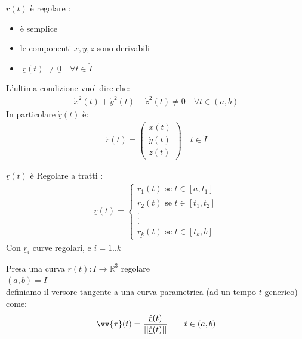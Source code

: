 \documentclass[a4paper, oneside]{article}
\begin{document}
\begin{definition}
    $\underbar{r}(t)$ è regolare :
    \begin{itemize}
        \item è semplice
        \item le componenti $x,y,z$ sono derivabili
        \item $\left\lvert \underline{\dot{r}}(t) \right\rvert \neq \underline{0} \quad \forall t \in \mathring{I}$
    \end{itemize}
    L'ultima condizione vuol dire che:
    \begin{gather*}
        \dot{x}^2(t) + \dot{y}^2(t) + \dot{z}^2(t) \neq 0 \quad \forall t \in (a,b)
    \end{gather*}
    In particolare $\underline{\dot{r}}(t)$ è:
    \begin{gather*}
        \underline{\dot{r}}(t) = \begin{pmatrix}
            \dot{x}(t)\\
            \dot{y}(t)\\
            \dot{z}(t)
        \end{pmatrix}\quad t \in \mathring{I}
    \end{gather*}
\end{definition}


\begin{definition}
    $\underline{r}(t)$ è Regolare  a tratti :
    \begin{gather*}
        \underline{r}(t) = \begin{cases}
            \underline{r_1}(t) \text{ se } t \in [a,t_1]\\
            \underline{r_2}(t) \text{ se } t \in [t_1,t_2]\\
            .\\
            .\\
            .\\
            \underline{r_k}(t) \text{ se } t \in [t_k,b]
        \end{cases}
    \end{gather*} 
    Con $\underline{r}_i$ curve regolari, e $i = 1..k$
\end{definition}


\begin{definition}
    Presa una curva $\underbar{r}(t):I \to \mathbb{R}^3$ regolare\\
     $(a,b) = I$\\
    definiamo il versore tangente a una curva parametrica (ad un tempo $t$ generico) come:
    \begin{gather*}
        \vv{\tau}(t) = \frac{\underline{\dot{r}}(t)}{||\underline{\dot{r}}(t)||} \qquad t \in (a,b)
    \end{gather*}
\end{definition}
\end{document}
